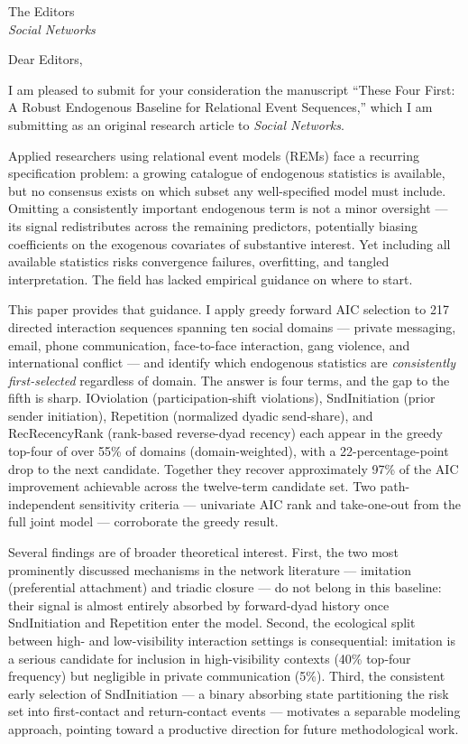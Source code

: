 \documentclass[11pt]{letter}
\begin{document}
\begin{letter}{The Editors\\
\textit{Social Networks}}

\opening{Dear Editors,}

I am pleased to submit for your consideration the manuscript ``These Four First:
A Robust Endogenous Baseline for Relational Event Sequences,'' which I am
submitting as an original research article to \textit{Social Networks}.

Applied researchers using relational event models (REMs) face a recurring
specification problem: a growing catalogue of endogenous statistics is available,
but no consensus exists on which subset any well-specified model must include.
Omitting a consistently important endogenous term is not a minor oversight ---
its signal redistributes across the remaining predictors, potentially biasing
coefficients on the exogenous covariates of substantive interest. Yet including
all available statistics risks convergence failures, overfitting, and tangled
interpretation. The field has lacked empirical guidance on where to start.

This paper provides that guidance. I apply greedy forward AIC selection to 217
directed interaction sequences spanning ten social domains --- private messaging,
email, phone communication, face-to-face interaction, gang violence, and
international conflict --- and identify which endogenous statistics are
\emph{consistently first-selected} regardless of domain. The answer is four
terms, and the gap to the fifth is sharp. IOviolation (participation-shift
violations), SndInitiation (prior sender initiation), Repetition (normalized
dyadic send-share), and RecRecencyRank (rank-based reverse-dyad recency) each
appear in the greedy top-four of over 55\% of domains (domain-weighted), with a
22-percentage-point drop to the next candidate. Together they recover
approximately 97\% of the AIC improvement achievable across the twelve-term
candidate set. Two path-independent sensitivity criteria --- univariate AIC rank
and take-one-out from the full joint model --- corroborate the greedy result.

Several findings are of broader theoretical interest. First, the two most
prominently discussed mechanisms in the network literature --- imitation
(preferential attachment) and triadic closure --- do not belong in this baseline:
their signal is almost entirely absorbed by forward-dyad history once
SndInitiation and Repetition enter the model. Second, the ecological split
between high- and low-visibility interaction settings is consequential:
imitation is a serious candidate for inclusion in high-visibility contexts
(40\% top-four frequency) but negligible in private communication (5\%). Third,
the consistent early selection of SndInitiation --- a binary absorbing state
partitioning the risk set into first-contact and return-contact events ---
motivates a separable modeling approach, pointing toward a productive direction
for future methodological work.


\end{letter}
\end{document}
